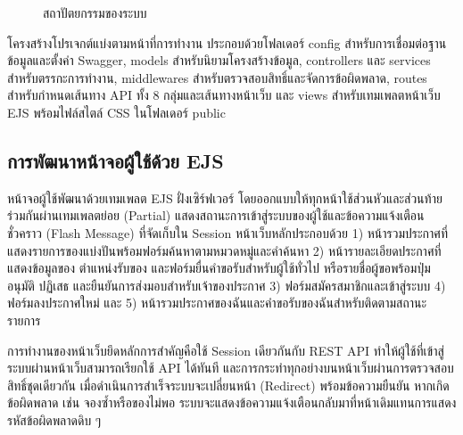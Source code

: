 \documentclass[12pt,a4paper]{report}
\begin{document}
\begin{figure}[htbp]
\centering
{}
\caption{สถาปัตยกรรมของระบบ}
\label{fig:arch}
\end{figure}

โครงสร้างโปรเจกต์แบ่งตามหน้าที่การทำงาน ประกอบด้วยโฟลเดอร์ config สำหรับการเชื่อมต่อฐานข้อมูลและตั้งค่า Swagger, models สำหรับนิยามโครงสร้างข้อมูล, controllers และ services สำหรับตรรกะการทำงาน, middlewares สำหรับตรวจสอบสิทธิ์และจัดการข้อผิดพลาด, routes สำหรับกำหนดเส้นทาง API ทั้ง 8 กลุ่มและเส้นทางหน้าเว็บ และ views สำหรับเทมเพลตหน้าเว็บ EJS พร้อมไฟล์สไตล์ CSS ในโฟลเดอร์ public

\subsection{การพัฒนาหน้าจอผู้ใช้ด้วย EJS}

หน้าจอผู้ใช้พัฒนาด้วยเทมเพลต EJS ฝั่งเซิร์ฟเวอร์ โดยออกแบบให้ทุกหน้าใช้ส่วนหัวและส่วนท้ายร่วมกันผ่านเทมเพลตย่อย (Partial) แสดงสถานะการเข้าสู่ระบบของผู้ใช้และข้อความแจ้งเตือนชั่วคราว (Flash Message) ที่จัดเก็บใน Session หน้าเว็บหลักประกอบด้วย 1) หน้ารวมประกาศที่แสดงรายการของแบ่งปันพร้อมฟอร์มค้นหาตามหมวดหมู่และคำค้นหา 2) หน้ารายละเอียดประกาศที่แสดงข้อมูลของ ตำแหน่งรับของ และฟอร์มยื่นคำขอรับสำหรับผู้ใช้ทั่วไป หรือรายชื่อผู้ขอพร้อมปุ่มอนุมัติ ปฏิเสธ และยืนยันการส่งมอบสำหรับเจ้าของประกาศ 3) ฟอร์มสมัครสมาชิกและเข้าสู่ระบบ 4) ฟอร์มลงประกาศใหม่ และ 5) หน้ารวมประกาศของฉันและคำขอรับของฉันสำหรับติดตามสถานะรายการ

การทำงานของหน้าเว็บยึดหลักการสำคัญคือใช้ Session เดียวกันกับ REST API ทำให้ผู้ใช้ที่เข้าสู่ระบบผ่านหน้าเว็บสามารถเรียกใช้ API ได้ทันที และการกระทำทุกอย่างบนหน้าเว็บผ่านการตรวจสอบสิทธิ์ชุดเดียวกัน เมื่อดำเนินการสำเร็จระบบจะเปลี่ยนหน้า (Redirect) พร้อมข้อความยืนยัน หากเกิดข้อผิดพลาด เช่น จองซ้ำหรือของไม่พอ ระบบจะแสดงข้อความแจ้งเตือนกลับมาที่หน้าเดิมแทนการแสดงรหัสข้อผิดพลาดดิบ ๆ
\end{document}
